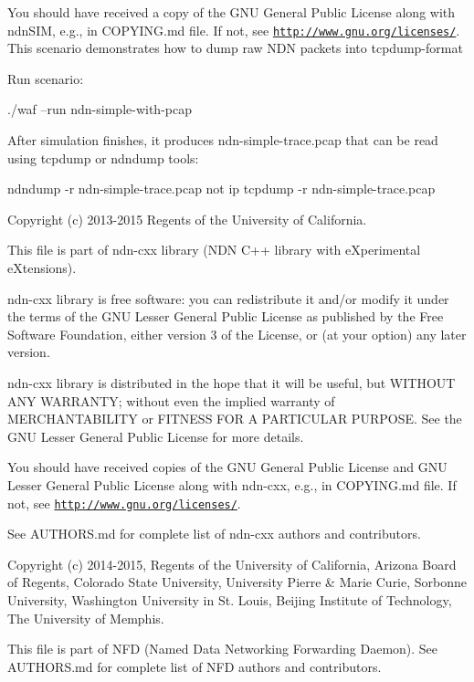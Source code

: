 You should have received a copy of the G\+NU General Public License along with ndn\+S\+IM, e.\+g., in C\+O\+P\+Y\+I\+N\+G.\+md file. If not, see \href{http://www.gnu.org/licenses/}{\tt http\+://www.\+gnu.\+org/licenses/}. This scenario demonstrates how to dump raw N\+DN packets into tcpdump-\/format

Run scenario\+: \begin{DoxyVerb}./waf --run ndn-simple-with-pcap
\end{DoxyVerb}


After simulation finishes, it produces {\ttfamily ndn-\/simple-\/trace.\+pcap} that can be read using tcpdump or ndndump tools\+:

ndndump -\/r ndn-\/simple-\/trace.\+pcap not ip tcpdump -\/r ndn-\/simple-\/trace.\+pcap

Copyright (c) 2013-\/2015 Regents of the University of California.

This file is part of ndn-\/cxx library (N\+DN C++ library with e\+Xperimental e\+Xtensions).

ndn-\/cxx library is free software\+: you can redistribute it and/or modify it under the terms of the G\+NU Lesser General Public License as published by the Free Software Foundation, either version 3 of the License, or (at your option) any later version.

ndn-\/cxx library is distributed in the hope that it will be useful, but W\+I\+T\+H\+O\+UT A\+NY W\+A\+R\+R\+A\+N\+TY; without even the implied warranty of M\+E\+R\+C\+H\+A\+N\+T\+A\+B\+I\+L\+I\+TY or F\+I\+T\+N\+E\+SS F\+OR A P\+A\+R\+T\+I\+C\+U\+L\+AR P\+U\+R\+P\+O\+SE. See the G\+NU Lesser General Public License for more details.

You should have received copies of the G\+NU General Public License and G\+NU Lesser General Public License along with ndn-\/cxx, e.\+g., in C\+O\+P\+Y\+I\+N\+G.\+md file. If not, see \href{http://www.gnu.org/licenses/}{\tt http\+://www.\+gnu.\+org/licenses/}.

See A\+U\+T\+H\+O\+R\+S.\+md for complete list of ndn-\/cxx authors and contributors.

Copyright (c) 2014-\/2015, Regents of the University of California, Arizona Board of Regents, Colorado State University, University Pierre \& Marie Curie, Sorbonne University, Washington University in St. Louis, Beijing Institute of Technology, The University of Memphis.

This file is part of N\+FD (Named Data Networking Forwarding Daemon). See A\+U\+T\+H\+O\+R\+S.\+md for complete list of N\+FD authors and contributors.

